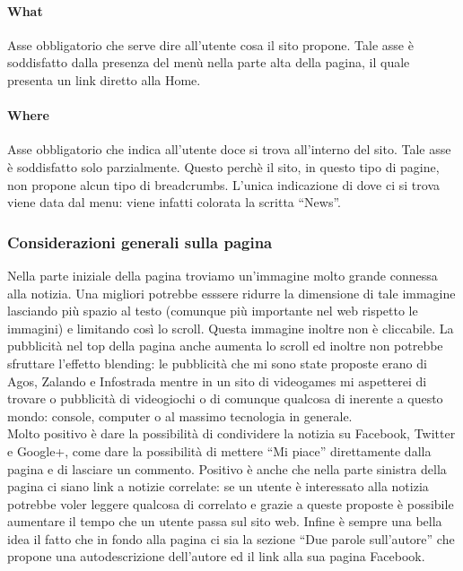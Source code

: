 \documentclass[../ProgettoTecWeb2.tex]{subfiles}
\begin{document}
			\paragraph{What}
			Asse obbligatorio che serve dire all'utente cosa il sito propone. Tale asse è soddisfatto dalla presenza del menù nella parte alta della pagina, il quale presenta un link diretto alla Home.

			\paragraph{Where}
			Asse obbligatorio che indica all'utente doce si trova all'interno del sito. Tale asse è soddisfatto solo parzialmente. Questo perchè il sito, in questo tipo di pagine, non propone alcun tipo di breadcrumbs. L'unica indicazione di dove ci si trova viene data dal menu: viene infatti colorata la scritta ``News''.

		\subsubsection{Considerazioni generali sulla pagina}
		Nella parte iniziale della pagina troviamo un'immagine molto grande connessa alla notizia. Una migliori potrebbe esssere ridurre la dimensione di tale immagine lasciando più spazio al testo (comunque più importante nel web rispetto le immagini) e limitando così lo scroll. Questa immagine inoltre non è cliccabile. La pubblicità nel top della pagina anche aumenta lo scroll ed inoltre non potrebbe sfruttare l'effetto blending: le pubblicità che mi sono state proposte erano di Agos, Zalando e Infostrada mentre in un sito di videogames mi aspetterei di trovare o pubblicità di videogiochi o di comunque qualcosa di inerente a questo mondo: console, computer o al massimo tecnologia in generale. \\

		Molto positivo è dare la possibilità di condividere la notizia su Facebook, Twitter e Google+, come dare la possibilità di mettere ``Mi piace'' direttamente dalla pagina e di lasciare un commento. Positivo è anche che nella parte sinistra della pagina ci siano link a notizie correlate: se un utente è interessato alla notizia potrebbe voler leggere qualcosa di correlato e grazie a queste proposte è possibile aumentare il tempo che un utente passa sul sito web. Infine è sempre una bella idea il fatto che in fondo alla pagina ci sia la sezione ``Due parole sull'autore'' che propone una autodescrizione dell'autore ed il link alla sua pagina Facebook.
\end{document}
